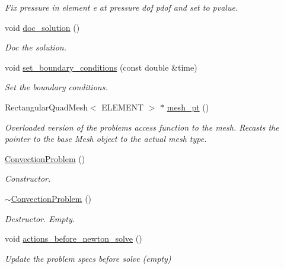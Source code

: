 \begin{DoxyCompactItemize}
\begin{DoxyCompactList}\small\item\em Fix pressure in element e at pressure dof pdof and set to pvalue. \end{DoxyCompactList}\item 
void \hyperlink{classConvectionProblem_ab7d9e5ac641ca08dd8b04c5eec179593}{doc\+\_\+solution} ()
\begin{DoxyCompactList}\small\item\em Doc the solution. \end{DoxyCompactList}\item 
void \hyperlink{classConvectionProblem_a605543718d51f7a77f75a46b48b543d7}{set\+\_\+boundary\+\_\+conditions} (const double \&time)
\begin{DoxyCompactList}\small\item\em Set the boundary conditions. \end{DoxyCompactList}\item 
Rectangular\+Quad\+Mesh$<$ E\+L\+E\+M\+E\+NT $>$ $\ast$ \hyperlink{classConvectionProblem_ad338a7928f0467b0fbad1b448c9a47c2}{mesh\+\_\+pt} ()
\begin{DoxyCompactList}\small\item\em Overloaded version of the problem\textquotesingle{}s access function to the mesh. Recasts the pointer to the base Mesh object to the actual mesh type. \end{DoxyCompactList}\item 
\hyperlink{classConvectionProblem_a16bb235fc46c4066134418a2323297c0}{Convection\+Problem} ()
\begin{DoxyCompactList}\small\item\em Constructor. \end{DoxyCompactList}\item 
\hyperlink{classConvectionProblem_a77c37355ba683b5b1ec11d096ce4d760}{$\sim$\+Convection\+Problem} ()
\begin{DoxyCompactList}\small\item\em Destructor. Empty. \end{DoxyCompactList}\item 
void \hyperlink{classConvectionProblem_a2fe48dd44ece8a0a69539ffcdce9ec11}{actions\+\_\+before\+\_\+newton\+\_\+solve} ()
\begin{DoxyCompactList}\small\item\em Update the problem specs before solve (empty) \end{DoxyCompactList}\item 

\end{DoxyCompactItemize}
